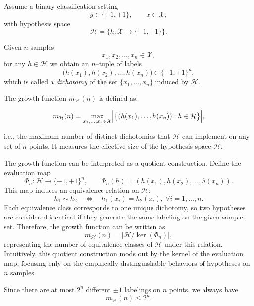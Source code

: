 \documentclass[../main]{subfiles}
\begin{document}
Assume a binary classification setting
\begin{equation}
    y \in \{-1,+1\}, \qquad x \in \mathcal{X},
\end{equation}
with hypothesis space
\begin{equation}
    \mathcal{H} = \{h:\mathcal{X}\to\{-1,+1\}\}.
\end{equation}

Given $n$ samples
\begin{equation}
    x_1,x_2,\dots,x_n \in \mathcal{X},
\end{equation}
for any $h\in\mathcal{H}$ we obtain an $n$–tuple of labels
\begin{equation}
    \bigl(h(x_1),h(x_2),\dots,h(x_n)\bigr) \in \{-1,+1\}^n,
\end{equation}
which is called a \emph{dichotomy} of the set $\{x_1,\dots,x_n\}$ induced by $\mathcal{H}$.

The growth function $m_{\mathcal{H}}(n)$ is defined as:
\begin{definition}
    \begin{equation}
        m_{\mathcal{H}}(n)
        = \max_{x_1,\dots,x_n \in \mathcal{X}}
          \Bigl|\bigl\{(h(x_1),\dots,h(x_n)) : h\in\mathcal{H}\bigr\}\Bigr|,
    \end{equation}
\end{definition}
i.e., the maximum number of distinct dichotomies that $\mathcal{H}$ can implement
on any set of $n$ points. It measures the effective size of the hypothesis space
$\mathcal{H}$.
\begin{note}
    The growth function can be interpreted as a quotient construction.  
    Define the evaluation map
    \begin{equation}
        \Phi_n : \mathcal{H} \to \{-1,+1\}^n, \qquad
        \Phi_n(h) = (h(x_1), h(x_2), \dots, h(x_n)).
    \end{equation}
    This map induces an equivalence relation on $\mathcal{H}$:
    \begin{equation}
        h_1 \sim h_2 \quad \Leftrightarrow \quad h_1(x_i) = h_2(x_i), \ \forall i = 1, \dots, n.
    \end{equation}
    Each equivalence class corresponds to one unique dichotomy,  
    so two hypotheses are considered identical if they generate the same labeling  
    on the given sample set. Therefore, the growth function can be written as
    \begin{equation}
        m_{\mathcal{H}}(n) = \bigl|\mathcal{H} / \ker(\Phi_n)\bigr|,
    \end{equation}
    representing the number of equivalence classes of $\mathcal{H}$ under this relation.  
    Intuitively, this quotient construction mods out by the kernel of the evaluation map,  
    focusing only on the empirically distinguishable behaviors of hypotheses on $n$ samples.
    \end{note}
    Since there are at most $2^n$ different $\pm1$ labelings on $n$ points, we always have
\begin{equation}
    m_{\mathcal{H}}(n) \le 2^n.
\end{equation}
\end{document}
